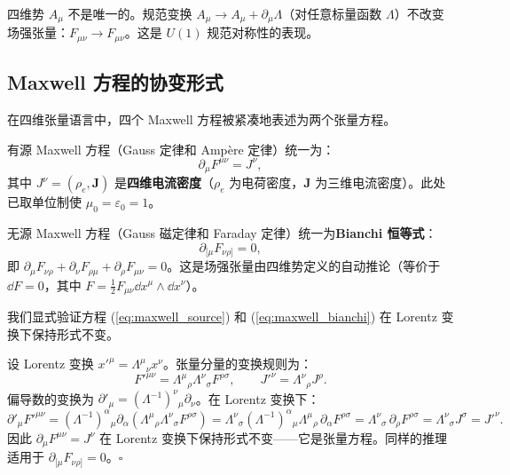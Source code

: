 \begin{note}[规范不变性]
四维势 $A_\mu$ 不是唯一的。规范变换 $A_\mu \to A_\mu + \partial_\mu \Lambda$（对任意标量函数 $\Lambda$）不改变场强张量：$F_{\mu\nu} \to F_{\mu\nu}$。这是 $U(1)$ 规范对称性的表现。
\end{note}

\subsection{Maxwell 方程的协变形式}

在四维张量语言中，四个 Maxwell 方程被紧凑地表述为两个张量方程。

\begin{theorem}
有源 Maxwell 方程（Gauss 定律和 Ampère 定律）统一为：
\begin{equation}\label{eq:maxwell_source}
    \boxed{\partial_\mu F^{\mu\nu} = J^\nu},
\end{equation}
其中 $J^\nu = (\rho_e, \mathbf{J})$ 是\textbf{四维电流密度}（$\rho_e$ 为电荷密度，$\mathbf{J}$ 为三维电流密度）。此处已取单位制使 $\mu_0 = \varepsilon_0 = 1$。

无源 Maxwell 方程（Gauss 磁定律和 Faraday 定律）统一为\textbf{Bianchi 恒等式}：
\begin{equation}\label{eq:maxwell_bianchi}
    \boxed{\partial_{[\mu} F_{\nu\rho]} = 0},
\end{equation}
即 $\partial_\mu F_{\nu\rho} + \partial_\nu F_{\rho\mu} + \partial_\rho F_{\mu\nu} = 0$。这是场强张量由四维势定义的自动推论（等价于 $\dd F = 0$，其中 $F = \frac{1}{2}F_{\mu\nu}\dd x^\mu \wedge \dd x^\nu$）。
\end{theorem}

\begin{example}
我们显式验证方程 (\ref{eq:maxwell_source}) 和 (\ref{eq:maxwell_bianchi}) 在 Lorentz 变换下保持形式不变。

设 Lorentz 变换 $x'^\mu = \Lambda^\mu{}_\nu x^\nu$。张量分量的变换规则为：
\[
F'^{\mu\nu} = \Lambda^\mu{}_\rho \Lambda^\nu{}_\sigma F^{\rho\sigma}, \qquad
J'^\nu = \Lambda^\nu{}_\rho J^\rho.
\]
偏导数的变换为 $\partial'_\mu = (\Lambda^{-1})^\nu{}_\mu \partial_\nu$。在 Lorentz 变换下：
\[
\partial'_\mu F'^{\mu\nu} = (\Lambda^{-1})^\alpha{}_\mu \partial_\alpha (\Lambda^\mu{}_\rho \Lambda^\nu{}_\sigma F^{\rho\sigma})
= \Lambda^\nu{}_\sigma (\Lambda^{-1})^\alpha{}_\mu \Lambda^\mu{}_\rho \,\partial_\alpha F^{\rho\sigma}
= \Lambda^\nu{}_\sigma \,\partial_\rho F^{\rho\sigma} = \Lambda^\nu{}_\sigma J^\sigma = J'^\nu.
\]
因此 $\partial_\mu F^{\mu\nu} = J^\nu$ 在 Lorentz 变换下保持形式不变——它是张量方程。同样的推理适用于 $\partial_{[\mu}F_{\nu\rho]} = 0$。\hfill $\square$
\end{example}


